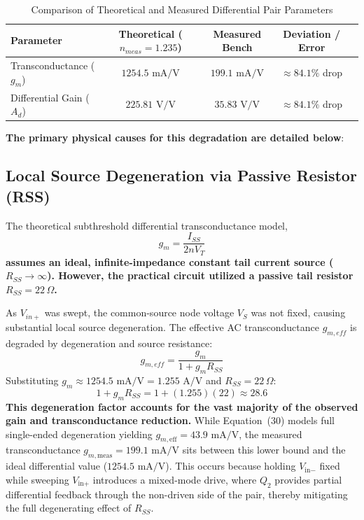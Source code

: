 \documentclass[11pt,a4paper]{article}
\begin{document}
\begin{table}[h!]
\centering
\caption{Comparison of Theoretical and Measured Differential Pair Parameters}
\begin{tabular}{lcccc}
\hline
\textbf{Parameter} & \textbf{Theoretical ($n_{meas} = 1.235$)} & \textbf{Measured Bench} & \textbf{Deviation / Error} \\ \hline
Transconductance ($g_m$) & $1254.5\text{ mA/V}$ & $199.1\text{ mA/V}$ & $\approx 84.1\%$ drop \\
Differential Gain ($A_d$) & $225.81\text{ V/V}$ & $35.83\text{ V/V}$ & $\approx 84.1\%$ drop \\ \hline
\end{tabular}
\label{tab:diff_pair_comparison}
\end{table}

\textbf{The primary physical causes for this degradation are detailed below}:

\subsection{Local Source Degeneration via Passive Resistor (RSS)}
The theoretical subthreshold differential transconductance model,
\begin{equation}
g_m = \frac{I_{SS}}{2 n V_T}
\end{equation}
\textbf{assumes an ideal, infinite-impedance constant tail current source ($R_{SS} \to \infty$). However, the practical circuit utilized a passive tail resistor $R_{SS} = 22\,\Omega$.} 

As $V_{in+}$ was swept, the common-source node voltage $V_S$ was not fixed, causing substantial local source degeneration. The effective AC transconductance $g_{m,eff}$ is degraded by degeneration and source resistance:
\begin{equation}
g_{m,eff} = \frac{g_m}{1 + g_m R_{SS}}
\end{equation}
Substituting $g_m \approx 1254.5\text{ mA/V} = 1.255\text{ A/V}$ and $R_{SS} = 22\,\Omega$:
\begin{equation}
1 + g_m R_{SS} = 1 + (1.255)(22) \approx 28.6
\end{equation}
\textbf{This degeneration factor accounts for the vast majority of the observed gain and transconductance reduction.}
While Equation~(30) models full single-ended degeneration yielding $g_{m,\text{eff}} = 43.9\text{ mA/V}$, the measured transconductance $g_{m,\text{meas}} = 199.1\text{ mA/V}$ sits between this lower bound and the ideal differential value ($1254.5\text{ mA/V}$). This occurs because holding $V_{\text{in}-}$ fixed while sweeping $V_{\text{in}+}$ introduces a mixed-mode drive, where $Q_2$ provides partial differential feedback through the non-driven side of the pair, thereby mitigating the full degenerating effect of $R_{SS}$.
\end{document}
